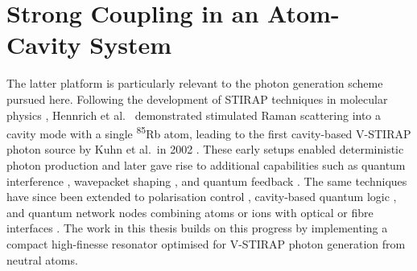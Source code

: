 \documentclass[../Thesis-IJspeert.tex]{subfiles}
\begin{document}
\graphicspath{ {"Strong Coupling in an Atom-Cavity System/figs/"} }

\chapter{Strong Coupling in an Atom-Cavity System}
\label{chap:StrongCouplinginanAtom-CavitySystem}

The latter platform is particularly relevant to the photon generation scheme pursued here. Following the development of STIRAP techniques in molecular physics \cite{Gaubatz1990}, Hennrich et al.\ \cite{Hennrich2000} demonstrated stimulated Raman scattering into a cavity mode with a single \textsuperscript{85}Rb atom, leading to the first cavity-based V-STIRAP photon source by Kuhn et al.\ in 2002 \cite{Kuhn2002}. These early setups enabled deterministic photon production and later gave rise to additional capabilities such as quantum interference \cite{Legero2004}, wavepacket shaping \cite{Nisbet2011}, and quantum feedback \cite{Barter2016}. The same techniques have since been extended to polarisation control \cite{Wilk2007}, cavity-based quantum logic \cite{Holleczek2015}, and quantum network nodes combining atoms or ions with optical or fibre interfaces \cite{Ritter2012, Keller2004, Blatt2004}. The work in this thesis builds on this progress by implementing a compact high-finesse resonator optimised for V-STIRAP photon generation from neutral atoms.
\end{document}
